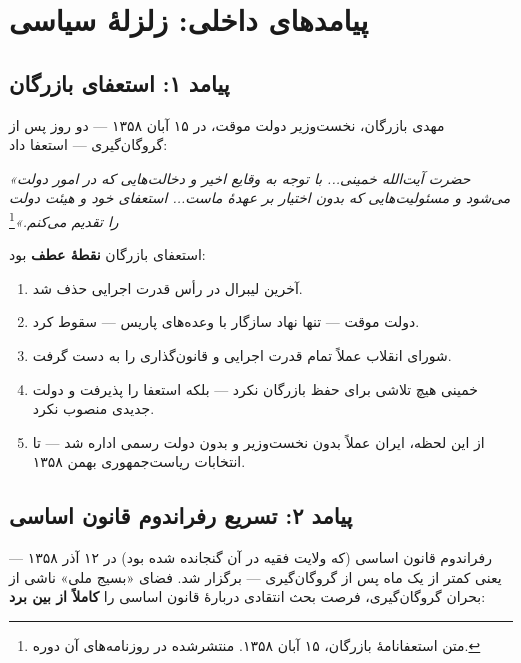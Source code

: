 \documentclass[12pt,a4paper]{book}
\newcommand{\keyword}[1]{\textbf{\textcolor{cPrimary}{#1}}}
\begin{document}
\section{پیامدهای داخلی: زلزلهٔ سیاسی}

\subsection{پیامد ۱: استعفای بازرگان}

مهدی بازرگان، نخست‌وزیر دولت موقت، در ۱۵ آبان ۱۳۵۸ — دو روز پس از گروگان‌گیری — استعفا داد:

\begin{noteBox}
\textit{«حضرت آیت‌الله خمینی... با توجه به وقایع اخیر و دخالت‌هایی که در امور دولت می‌شود و مسئولیت‌هایی که بدون اختیار بر عهدهٔ ماست... استعفای خود و هیئت دولت را تقدیم می‌کنم.»}\footnote{متن استعفانامهٔ بازرگان، ۱۵ آبان ۱۳۵۸. منتشرشده در روزنامه‌های آن دوره.}
\end{noteBox}

\begin{principleBox}
استعفای بازرگان \keyword{نقطهٔ عطف} بود:
\begin{enumerate}[label=\textcolor{cPrimary}{\bfseries\arabic*.}, rightmargin=2em]
    \item آخرین لیبرال در رأس قدرت اجرایی حذف شد.
    \item دولت موقت — تنها نهاد سازگار با وعده‌های پاریس — سقوط کرد.
    \item شورای انقلاب عملاً تمام قدرت اجرایی و قانون‌گذاری را به دست گرفت.
    \item خمینی هیچ تلاشی برای حفظ بازرگان نکرد — بلکه استعفا را پذیرفت و دولت جدیدی منصوب نکرد.
    \item از این لحظه، ایران عملاً بدون نخست‌وزیر و بدون دولت رسمی اداره شد — تا انتخابات ریاست‌جمهوری بهمن ۱۳۵۸.
\end{enumerate}
\end{principleBox}

\subsection{پیامد ۲: تسریع رفراندوم قانون اساسی}

رفراندوم قانون اساسی (که ولایت فقیه در آن گنجانده شده بود) در ۱۲ آذر ۱۳۵۸ — یعنی کمتر از یک ماه پس از گروگان‌گیری — برگزار شد. فضای «بسیج ملی» ناشی از بحران گروگان‌گیری، فرصت بحث انتقادی دربارهٔ قانون اساسی را \keyword{کاملاً از بین برد}:
\end{document}
